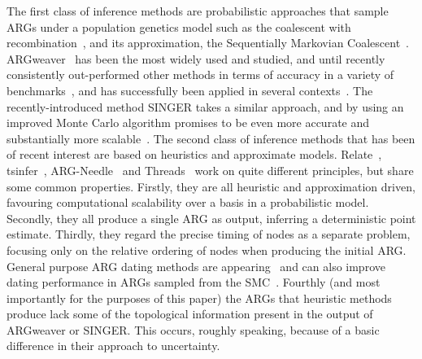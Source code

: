 \documentclass{article}
\begin{document}
The first class of inference methods are probabilistic approaches 
that sample ARGs under a population genetics model such as the
coalescent with recombination~\citep{hudson_properties_1983},
and its approximation, the Sequentially Markovian
Coalescent~\citep{mcvean_approximating_2005,marjoram_fast_2006}.
ARGweaver~\citep{rasmussen_genome-wide_2014,hubisz_mapping_2020}
has been the most widely used and studied,
and until recently consistently out-performed other methods in terms
of accuracy in a variety of benchmarks~\citep{brandt2022evaluation},
and has successfully been applied in several
contexts~\citep[e.g.,][]{de_chimpanzee_2016,shriner_whole_2018,hejase_genomic_2020,
stankowski_genetic_2024}.
The recently-introduced method SINGER takes a similar approach,
and by using an improved Monte Carlo algorithm
promises to be even more accurate and substantially more
scalable~\citep{deng_robust_2024}.
The second class of inference methods that has been of recent interest
are based on heuristics and approximate models.
Relate~\citep{speidel_method_2019},
tsinfer~\citep{kelleher_inferring_2019},
ARG-Needle~\citep{zhang_biobank-scale_2023}
and Threads~\citep{gunnarsson_scalable_2024}
work on quite different
principles, but share some common properties.
Firstly, they are all
heuristic and approximation driven, favouring computational
scalability over a basis in a probabilistic model. 
Secondly, they all produce a single
ARG as output, inferring a deterministic point estimate.
Thirdly, they regard the precise timing of nodes as a separate
problem, focusing only on the relative ordering of nodes when
producing the initial ARG. General purpose ARG dating methods are
appearing~\citep{wohns_unified_2022,deng2025general} and can also improve
dating performance in ARGs sampled from the SMC~\citep{deng2025general}.
Fourthly (and most importantly for the
purposes of this paper) the ARGs that heuristic methods produce
lack some of the topological information present in the output of ARGweaver or SINGER.
This occurs, roughly speaking, because of a basic difference in their
approach to uncertainty.
\end{document}
